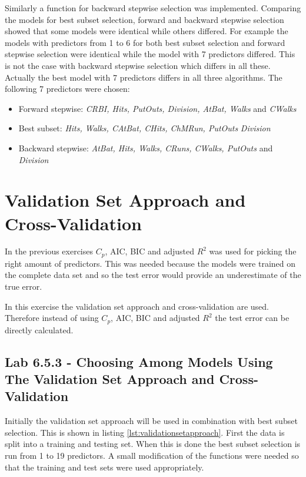Similarly a function for backward stepwise selection was implemented. Comparing the models for best subset selection, forward and backward stepwise selection showed that some models were identical while others differed. For example the models with predictors from 1 to 6 for both best subset selection and forward stepwise selection were identical while the model with 7 predictors differed. This is not the case with backward stepwise selection which differs in all these. Actually the best model with 7 predictors differs in all three algorithms. The following 7 predictors were chosen:

\begin{itemize}
\item Forward stepwise: \emph{CRBI, Hits, PutOuts, Division, AtBat, Walks} and \emph{CWalks}
\item Best subset: \emph{Hits, Walks, CAtBat, CHits, ChMRun, PutOuts} \emph{Division}
\item Backward stepwise: \emph{AtBat, Hits, Walks, CRuns, CWalks, PutOuts} and \emph{Division}
\end{itemize}

\section{Validation Set Approach and Cross-Validation}
In the previous exercises $C_p$, AIC, BIC and adjusted $R^2$ was used for picking the right amount of predictors. This was needed because the models were trained on the complete data set and so the test error would provide an underestimate of the true error.

In this exercise the validation set approach and cross-validation are used. Therefore instead of using $C_p$, AIC, BIC and adjusted $R^2$ the test error can be directly calculated. 
\subsection{Lab 6.5.3 - Choosing Among Models Using The Validation Set Approach and Cross-Validation}

Initially the validation set approach will be used in combination with best subset selection. This is shown in listing \ref{lst:validationsetapproach}. First the data is split into a training and testing set. When this is done the best subset selection is run from 1 to 19 predictors. A small modification of the functions were needed so that the training and test sets were used appropriately.


